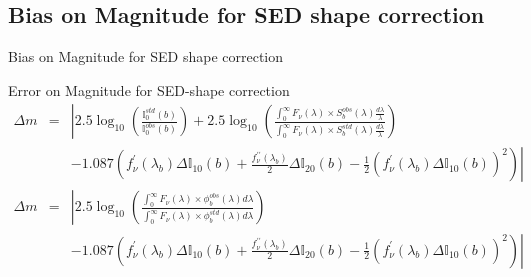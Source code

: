 \documentclass{beamer}
\begin{document}
\subsection{Bias on Magnitude for SED shape correction}
\begin{frame}{Bias on Magnitude for SED shape correction}
\begin{alertblock}{Error on Magnitude for SED-shape correction}
\begin{eqnarray}
\Delta m & = & \left| 2.5 \log_{10}\left(
\frac{\mathbb{I}_0^{std}(b)}
{\mathbb{I}_0^{obs}(b)}\right) +
2.5 \log_{10} 
	\left( 
	\frac{\int_0^\infty F_\nu(\lambda) \times S_b^{obs}(\lambda) \frac{d\lambda}{\lambda} }{\int_0^\infty F_\nu(\lambda) \times S_b^{std}(\lambda) \frac{d\lambda}{\lambda}} 
	\right) \right. \nonumber \\
    & & \left. - 1.087\left( f_\nu^\prime(\lambda_b) \Delta \mathbb{I}_{10}(b) +
          \frac{f_\nu^{\prime\prime}(\lambda_b)}{2}\Delta \mathbb{I}_{20}(b) \right. 
         - \left. \frac{1}{2}\left( f_\nu^\prime(\lambda_b) \Delta \mathbb{I}_{10}(b) \right)^2             
          \right)\right| \nonumber \\
\Delta m & = & \left| 
2.5 \log_{10} 
	\left( 
	\frac{\int_0^\infty F_\nu(\lambda) \times \phi_b^{obs}(\lambda) d\lambda}{\int_0^\infty F_\nu(\lambda) \times \phi_b^{std}(\lambda)d\lambda} 
	\right) \right. \nonumber \\
    & & \left. - 1.087\left( f_\nu^\prime(\lambda_b) \Delta \mathbb{I}_{10}(b) +
          \frac{f_\nu^{\prime\prime}(\lambda_b)}{2}\Delta \mathbb{I}_{20}(b) \right. 
         - \left. \frac{1}{2}\left( f_\nu^\prime(\lambda_b) \Delta \mathbb{I}_{10}(b) \right)^2             
          \right)\right| \nonumber
\end{eqnarray}  
\end{alertblock}
\end{frame}
\end{document}
